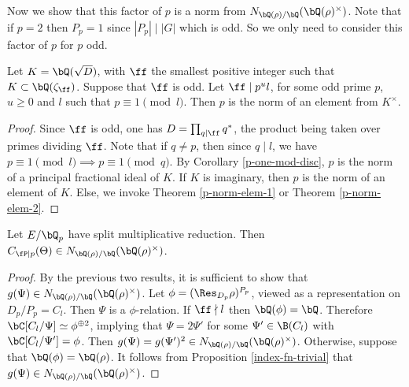 Now we show that this factor of $p$ is a norm from $\fieldnorm{\rho}$.
Note that if $p = 2$ then $P_p = 1$ since $|P_p| \mid |G|$ which is odd. So we only need to consider this factor of $p$ for $p$ odd.

\begin{lemma}\label{p-norm-odd}
    Let $K = \bQ(\sqrt{D})$, with $\ff$ the smallest positive integer such that $K \subset \bQ(\zeta_{\ff})$. Suppose that $\ff$ is odd. Let $\ff \mid p^u l $, for some odd prime $p$, $u \geq 0$ and $l$ such that $p \equiv 1 \pmod l$. Then $p$ is the norm of an element from $K^{\times}$.
\end{lemma}

\begin{proof}
    Since $\ff$ is odd, one has $D = \prod_{q | \ff} q^*$, the product being taken over primes dividing $\ff$. Note that if $q \not= p$, then since $q \mid l$, we have $p \equiv 1 \pmod l \implies p \equiv 1 \pmod q$. By Corollary \ref{p-one-mod-disc},  $p$ is the norm of a principal fractional ideal of $K$. If $K$ is imaginary, then $p$ is the norm of an element of $K$. Else, we invoke Theorem \ref{p-norm-elem-1} or Theorem \ref{p-norm-elem-2}.
\end{proof}

\begin{cor}
Let $E / \bQ_p$ have split multiplicative reduction. Then $C_{\fP \mid p}(\Theta) \in \fieldnorm{\rho}$.
\end{cor}

\begin{proof}
By the previous two results, it is sufficient to show that $g(\Psi) \in \fieldnorm{\rho}$. Let $\phi = (\Res_{D_p} \rho)^{P_p}$, viewed as a representation on $D_p / P_p = C_l$. Then $\Psi$ is a $\phi$-relation. If $\ff \nmid l$ then $\bQ(\phi) = \bQ$. Therefore $\bC[C_l / \Psi] \simeq \phi^{\oplus 2}$, implying that $\Psi = 2\Psi'$ for some $\Psi' \in \B(C_l)$ with $\bC[C_l / \Psi'] = \phi$. Then $g(\Psi) = g(\Psi')^2 \in \fieldnorm{\rho}$. Otherwise, suppose that $\bQ(\phi) = \bQ(\rho)$. It follows from Proposition \ref{index-fn-trivial} that $g(\Psi) \in \fieldnorm{\rho}$.
\end{proof}

